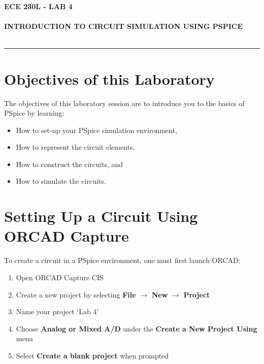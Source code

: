 \documentclass[12pt]{../manual}
\begin{document}
\begin{center}
\textbf{\huge ECE 230L - LAB 4}\\~\\
\textbf{\large INTRODUCTION TO CIRCUIT SIMULATION USING PSPICE}\\~\\
\rule{6.5in}{0.5mm}
\end{center}

\tableofcontents

\listoffigures

\newpage
%
\section{Objectives of this Laboratory}
The objectives of this laboratory session are to introduce you to the basics of PSpice by learning:
\begin{itemize}
\item How to set-up your PSpice simulation environment,
\item How to represent the circuit elements,
\item How to construct the circuits, and
\item How to simulate the circuits.
\end{itemize}
%
\section{Setting Up a Circuit Using ORCAD Capture}
To create a circuit in a PSpice environment, one must first launch ORCAD:
\begin{enumerate}
	\item Open ORCAD Capture CIS
	\item Create a new project by selecting {\bf File} $\to$ {\bf New} $\to$ {\bf Project}
	\item Name your project `Lab 4'
	\item Choose {\bf Analog or Mixed A/D} under the {\bf Create a New Project Using} menu
	\item Select {\bf Create a blank project} when prompted
\end{enumerate}
\end{document}
